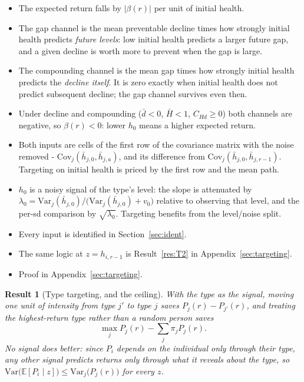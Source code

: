 \documentclass[11pt]{article}
\newtheorem{result}{Result}
\theoremstyle{remark}
\newcommand{\E}{\mathbb{E}}
\newcommand{\Var}{\mathrm{Var}}
\newcommand{\Cov}{\mathrm{Cov}}
\begin{document}
\begin{itemize}
\item The expected return falls by $|\beta(r)|$ per unit of initial health.
\item The gap channel is the mean preventable decline times how strongly initial health predicts \emph{future levels}: low initial health predicts a larger future gap, and a given decline is worth more to prevent when the gap is large.
\item The compounding channel is the mean gap times how strongly initial health predicts the \emph{decline itself}.
It is zero exactly when initial health does not predict subsequent decline; the gap channel survives even then.
\item Under decline and compounding ($\bar d<0$, $\bar H<1$, $C_{Hd}\ge0$) both channels are negative, so $\beta(r)<0$: lower $h_0$ means a higher expected return.
\item Both inputs are cells of the first row of the covariance matrix with the noise removed - $\Cov_j(\bar h_{j,0},\bar h_{j,a})$, and its difference from $\Cov_j(\bar h_{j,0},\bar h_{j,r-1})$.
Targeting on initial health is priced by the first row and the mean path.
\item $h_0$ is a noisy signal of the type's level: the slope is attenuated by $\lambda_0=\Var_j(\bar h_{j,0})/\bigl(\Var_j(\bar h_{j,0})+v_0\bigr)$ relative to observing that level, and the per-sd comparison by $\sqrt{\lambda_0}$.
Targeting benefits from the level/noise split.
\item Every input is identified in Section~\ref{sec:ident}.
\item The same logic at $z=h_{i,r-1}$ is Result~\ref{res:T2} in Appendix~\ref{sec:targeting}.
\item Proof in Appendix~\ref{sec:targeting}.
\end{itemize}

\begin{result}[Type targeting, and the ceiling]\label{res:type}
With the type as the signal, moving one unit of intensity from type $j'$ to type $j$ saves $P_j(r)-P_{j'}(r)$, and treating the highest-return type rather than a random person saves
\begin{equation}
\max_j P_j(r)-\sum_j\pi_jP_j(r).
\end{equation}
No signal does better: since $P_i$ depends on the individual only through their type, any other signal predicts returns only through what it reveals about the type, so $\Var\bigl(\E[P_i\mid z]\bigr)\le\Var_j\bigl(P_j(r)\bigr)$ for every $z$.
\end{result}
\end{document}
